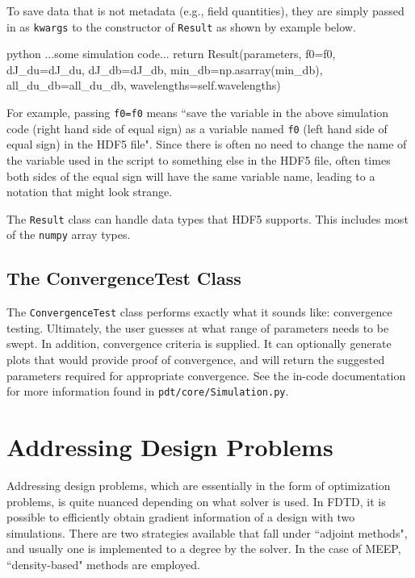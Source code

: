 \documentclass[12pt]{article}
\begin{document}
To save data that is not metadata (e.g., field quantities), they are simply passed in as \texttt{kwargs} to the constructor of \texttt{Result} as shown by example below.
\begin{mintedbox}{python}
	...some simulation code...
	return Result(parameters, f0=f0, dJ_du=dJ_du, dJ_db=dJ_db, min_db=np.asarray(min_db), all_du_db=all_du_db, wavelengths=self.wavelengths)
\end{mintedbox}

For example, passing \texttt{f0=f0} means ``save the variable in the above simulation code (right hand side of equal sign) as a variable named \texttt{f0} (left hand side of equal sign) in the HDF5 file". Since there is often no need to change the name of the variable used in the script to something else in the HDF5 file, often times both sides of the equal sign will have the same variable name, leading to a notation that might look strange.

The \texttt{Result} class can handle data types that HDF5 supports. This includes most of the \texttt{numpy} array types.

\subsection{The ConvergenceTest Class}
The \texttt{ConvergenceTest} class performs exactly what it sounds like: convergence testing. Ultimately, the user guesses at what range of parameters needs to be swept. In addition, convergence criteria is supplied. It can optionally generate plots that would provide proof of convergence, and will return the suggested parameters required for appropriate convergence. See the in-code documentation for more information found in \texttt{pdt/core/Simulation.py}.

\section{Addressing Design Problems}
Addressing design problems, which are essentially in the form of optimization problems, is quite nuanced depending on what solver is used. In FDTD, it is possible to efficiently obtain gradient information of a design with two simulations. There are two strategies available that fall under ``adjoint methods", and usually one is implemented to a degree by the solver. In the case of MEEP, ``density-based" methods are employed. 
\end{document}
